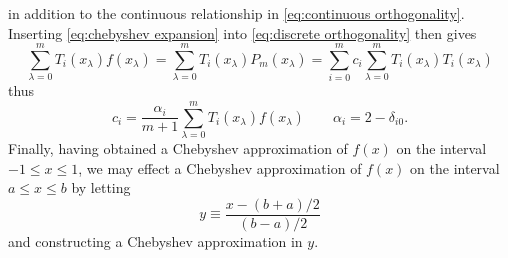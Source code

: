 in addition to the continuous relationship in \cref{eq:continuous orthogonality}.
Inserting \cref{eq:chebyshev expansion} into \cref{eq:discrete orthogonality} then gives
\begin{equation}
  \sum_{\lambda = 0}^{m} T_i(x_\lambda) f(x_\lambda) = \sum_{\lambda = 0}^{m}T_i(x_\lambda) P_m(x_\lambda) = \sum_{i = 0}^m c_i \sum_{\lambda = 0}^{m}T_i(x_\lambda) T_i(x_\lambda)
\end{equation}
thus
\begin{equation}
  c_i = \frac{\alpha_i}{m + 1} \sum_{\lambda = 0}^{m}T_i(x_\lambda) f(x_\lambda) \qquad \alpha_i = 2 - \delta_{i 0}.
  \label{eq:chebyshev coefficient}
\end{equation}
Finally, having obtained a Chebyshev approximation of $f(x)$ on the interval $-1 \leqslant x \leqslant 1$, we may effect a Chebyshev approximation of $f(x)$ on the interval $a \leqslant x \leqslant b$ by letting
\begin{equation}
  y \equiv \frac{x - (b + a)/2}{(b-a)/2}
\end{equation}
and constructing a Chebyshev approximation in $y$.

